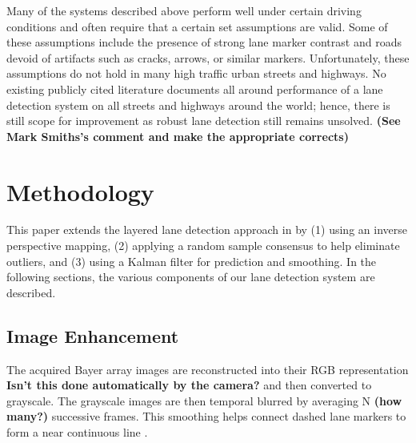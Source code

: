 \documentclass{article}
\begin{document}
Many of the systems described above perform well under certain driving conditions and often require that a certain set assumptions are valid.  Some of these assumptions include the  presence of strong lane marker contrast and roads devoid of artifacts such as cracks, arrows, or similar markers. Unfortunately, these assumptions do not hold in many high traffic urban streets and highways. No existing publicly cited literature documents all around performance of a lane detection system on all streets and highways around the world; hence, there is still scope for improvement as robust lane detection still remains unsolved. {\bf (See Mark Smiths's comment and make the appropriate corrects)}

\section{Methodology}
\label{sec:methodology}
This paper extends the layered lane detection approach in \cite{borkar_layered_2009} by (1) using an inverse perspective mapping, (2) applying a random sample consensus to help eliminate outliers, and (3) using a Kalman filter for prediction and smoothing.
In the following sections, the various components of our lane detection system are described.
\subsection{Image Enhancement}
The acquired Bayer array images are reconstructed into their RGB representation {\bf Isn't this done automatically by the camera?} and then converted to grayscale. The grayscale images are then temporal blurred by averaging N {\bf (how many?)} successive frames.  This smoothing helps connect dashed lane markers to form a near continuous line \cite{borkar_layered_2009}.
\end{document}
